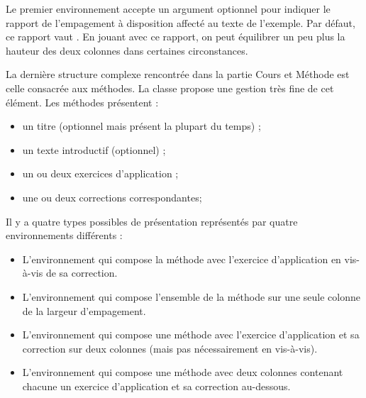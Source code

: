 \documentclass[nocrop]{sesamanuel}
\begin{document}
Le premier environnement accepte un argument optionnel pour indiquer
le rapport de l'empagement à disposition affecté au texte de
l'exemple. Par défaut, ce rapport vaut . En jouant avec ce
rapport, on peut équilibrer un peu plus la hauteur des deux colonnes
dans certaines circonstances.


\renewcommand{\StringDOCUMENTATION}{Méthode}
\begin{documentation}
La dernière structure complexe rencontrée dans la partie Cours et
Méthode est celle consacrée aux méthodes. La classe 
propose une gestion très fine de cet élément. Les méthodes
présentent :
\begin{itemize}
\item un titre (optionnel mais présent la plupart du temps) ;
\item un texte introductif (optionnel) ;
\item un ou deux exercices d'application ;
\item une ou deux corrections correspondantes;
\end{itemize}
\end{documentation}

Il y a quatre types possibles de présentation
représentés par quatre environnements différents :
\begin{itemize}
\item L'environnement  qui compose la méthode avec
  l'exercice d'application en vis-à-vis de sa correction.
\item L'environnement  qui compose l'ensemble de la
  méthode sur une seule colonne de la largeur d'empagement.
\item L'environnement  qui compose une méthode avec
  l'exercice d'application et sa correction sur deux colonnes (mais
  pas nécessairement en vis-à-vis).
\item L'environnement  qui compose une méthode
  avec deux colonnes contenant chacune un exercice d'application et sa
  correction au-dessous.
\end{itemize}
\end{document}

